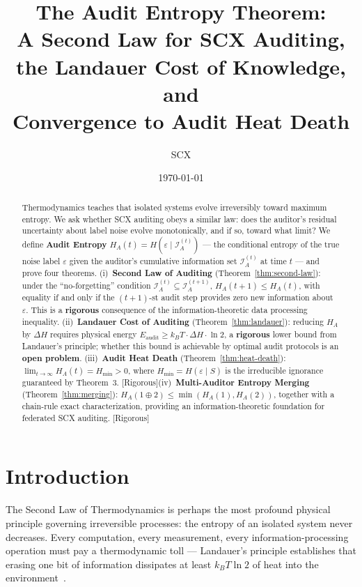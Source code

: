 \documentclass[12pt,a4paper]{article}
\title{\bfseries The Audit Entropy Theorem:\\
A Second Law for SCX Auditing,\\
the Landauer Cost of Knowledge, and\\
Convergence to Audit Heat Death}
\author{SCX}
\date{\today}
\newcommand{\rigorous}{\textcolor{green!50!black}{\small\textsf{[Rigorous]}}}
\newcommand{\cI}{\mathcal{I}}
\begin{document}
\maketitle

\begin{abstract}
Thermodynamics teaches that isolated systems evolve irreversibly toward maximum entropy. We ask whether SCX auditing obeys a similar law: does the auditor's residual uncertainty about label noise evolve monotonically, and if so, toward what limit? We define \textbf{Audit Entropy} $H_A(t)=H(\varepsilon\mid\cI_A^{(t)})$ --- the conditional entropy of the true noise label $\varepsilon$ given the auditor's cumulative information set $\cI_A^{(t)}$ at time $t$ --- and prove four theorems. (i)~\textbf{Second Law of Auditing} (Theorem~\ref{thm:second-law}): under the ``no-forgetting'' condition $\cI_A^{(t)}\subseteq\cI_A^{(t+1)}$, $H_A(t+1)\leq H_A(t)$, with equality if and only if the $(t+1)$-st audit step provides zero new information about $\varepsilon$. This is a \textbf{rigorous} consequence of the information-theoretic data processing inequality. (ii)~\textbf{Landauer Cost of Auditing} (Theorem~\ref{thm:landauer}): reducing $H_A$ by $\Delta H$ requires physical energy $E_{\mathrm{audit}}\geq k_B T\cdot\Delta H\cdot\ln2$, a \textbf{rigorous} lower bound from Landauer's principle; whether this bound is achievable by optimal audit protocols is an \textbf{open problem}. (iii)~\textbf{Audit Heat Death} (Theorem~\ref{thm:heat-death}): $\lim_{t\to\infty}H_A(t)=H_{\min}>0$, where $H_{\min}=H(\varepsilon\mid S)$ is the irreducible ignorance guaranteed by Theorem~3. \rigorous (iv)~\textbf{Multi-Auditor Entropy Merging} (Theorem~\ref{thm:merging}): $H_A(1\oplus2)\leq\min(H_A(1),H_A(2))$, together with a chain-rule exact characterization, providing an information-theoretic foundation for federated SCX auditing. \rigorous
\end{abstract}

\section{Introduction}

The Second Law of Thermodynamics is perhaps the most profound physical principle governing irreversible processes: the entropy of an isolated system never decreases. Every computation, every measurement, every information-processing operation must pay a thermodynamic toll --- Landauer's principle establishes that erasing one bit of information dissipates at least $k_B T\ln 2$ of heat into the environment~\citep{landauer1961irreversibility}.
\end{document}
